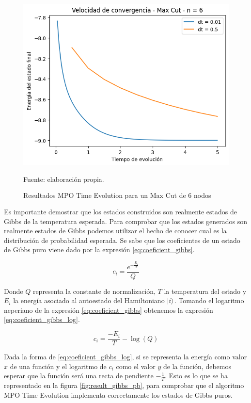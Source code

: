\newpage

\begin{figure}[!h]
    \centering
    \includegraphics[scale = 0.7]{plt/a05-tevo_max_cut_n_6.png}
    \caption{Resultados MPO Time Evolution para un Max Cut de 6 nodos}
    Fuente: elaboración propia.
    \label{fig:result_tevo}
\end{figure}

Es importante demostrar que los estados construidos son realmente estados de Gibbs de la temperatura esperada. Para comprobar que los estados generados son realmente estados de Gibbs podemos utilizar el hecho de conocer cual es la distribución de probabilidad esperada. Se sabe que los coeficientes de un estado de Gibbs puro viene dado por la expresión \ref{eq:coeficient_gibbs}.

\begin{equation}
c_{i} = \frac{e^{- \frac{E_{i}}{T}}}{Q}
\label{eq:coeficient_gibbs}
\end{equation}

Donde $Q$ representa la constante de normalización, $T$ la temperatura del estado y $E_{i}$ la energía asociado al autoestado del Hamiltoniano $\ket{i}$. Tomando el logaritmo neperiano de la expresión \ref{eq:coeficient_gibbs} obtenemos la expresión \ref{eq:coeficient_gibbs_log}.

\begin{equation}
c_{i} = \frac{- E_{i}}{T} - \log(Q)
\label{eq:coeficient_gibbs_log}
\end{equation}

Dada la forma de \ref{eq:coeficient_gibbs_log}, si se representa la energía como valor $x$ de una función y el logaritmo de $c_{i}$ como el valor $y$ de la función, debemos esperar que la función será una recta de pendiente $-\frac{1}{T}$. Esto es lo que se ha representado en la figura \ref{fig:result_gibbs_pb}, para comprobar que el algoritmo MPO Time Evolution implementa correctamente los estados de Gibbs puros.

